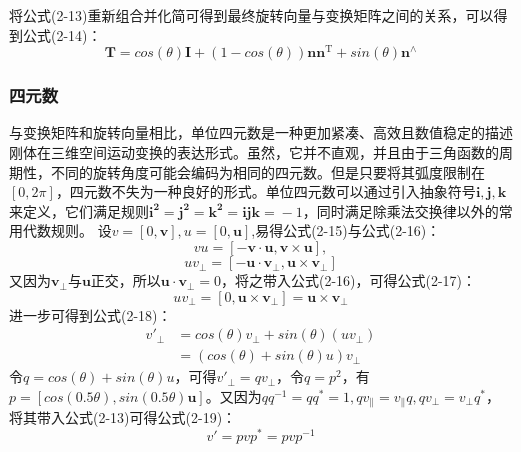     将公式(2-13)重新组合并化简可得到最终旋转向量与变换矩阵之间的关系，可以得到公式(2-14)：
    \begin{equation}
        \mathbf{T} = cos(\theta)\mathbf{I} + (1-cos(\theta))\mathbf{n}\mathbf{n}^\mathrm{T} + sin(\theta)\mathbf{n}^\land
    \end{equation}

    \subsubsection{四元数}
    与变换矩阵和旋转向量相比，单位四元数是一种更加紧凑、高效且数值稳定的描述刚体在三维空间运动变换的表达形式。虽然，它并不直观，并且由于三角函数的周期性，不同的旋转角度可能会编码为相同的四元数。但是只要将其弧度限制在$[0,2\pi]$，四元数不失为一种良好的形式。单位四元数可以通过引入抽象符号$\mathbf{i,j,k}$来定义，它们满足规则$\mathbf{i^2=j^2=k^2=ijk=}-1$，同时满足除乘法交换律以外的常用代数规则。
    设$v=[0,\mathbf{v}], u=[0,\mathbf{u}]$,易得公式(2-15)与公式(2-16)：
    \begin{equation}
        vu=[-\mathbf{v}\cdot \mathbf{u}, \mathbf{v}\times \mathbf{u}],
    \end{equation}
    \begin{equation}
        uv_\perp= [-\mathbf{u}\cdot \mathbf{v}_\perp, \mathbf{u}\times \mathbf{v}_\perp]
    \end{equation}
    又因为$\mathbf{v_\perp}$与$\mathbf{u}$正交，所以$\mathbf{u}\cdot \mathbf{v_\perp}=0$，将之带入公式(2-16)，可得公式(2-17)：
    \begin{equation}
        uv_\perp= [0, \mathbf{u}\times \mathbf{v}_\perp] = \mathbf{u}\times \mathbf{v}_\perp
    \end{equation}
    进一步可得到公式(2-18)：
    \begin{equation}
        \begin{aligned}
        v'_\perp 
    &= cos(\theta) v_\perp + sin(\theta)(uv_\perp)\\
    &=(cos(\theta)+sin(\theta)u)v_\perp
        \end{aligned}
    \end{equation}
    令$q=cos(\theta)+sin(\theta)u$，可得$v'_\perp=qv_\perp$，令$q=p^2$，有$p=[cos(0.5\theta),sin(0.5\theta)\mathbf{u}]$。又因为$qq^{-1}=qq^*=1,qv_\parallel=v_\parallel q, qv_\perp= v_\perp q^*$，将其带入公式(2-13)可得公式(2-19)：
    \begin{equation}
        v' = pvp^*=pvp^{-1}
    \end{equation}

